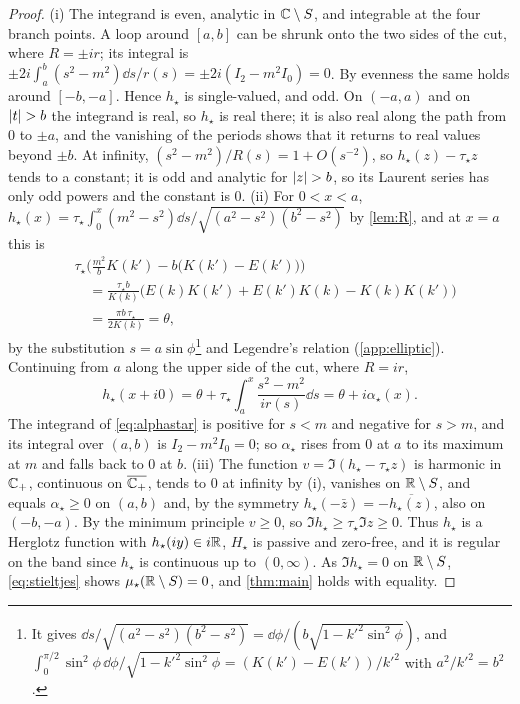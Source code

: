 \begin{proof}
(i) The integrand is even, analytic in $\mathbb C\setminus S$, and integrable at the
four branch points. A loop around $[a,b]$ can be shrunk onto the two sides of
the cut, where $R=\pm ir$; its integral is $\pm2i\int_a^b(s^2-m^2)\dd s/r(s)
=\pm2i(I_2-m^2I_0)=0$. By evenness the same holds around $[-b,-a]$. Hence
$h_\star$ is single-valued, and odd. On $(-a,a)$ and on $\abs t>b$ the
integrand is real, so $h_\star$ is real there; it is also real along the
path from $0$ to $\pm a$, and the vanishing of the periods shows that it
returns to real values beyond $\pm b$. At infinity,
$(s^2-m^2)/R(s)=1+O(s^{-2})$, so $h_\star(z)-\tau_\star z$ tends to a constant;
it is odd and analytic for $\abs z>b$, so its Laurent series has only odd
powers and the constant is $0$.
(ii) For $0<x<a$, $h_\star(x)=\tau_\star\int_0^x(m^2-s^2)\dd s/\sqrt{(a^2-s^2)(b^2-s^2)}$
by \cref{lem:R}, and at $x=a$ this is
\begin{align*}
&\tau_\star\Big(\frac{m^2}bK(k')-b\big(K(k')-E(k')\big)\Big)\\
&\quad=\frac{\tau_\star b}{K(k)}\big(E(k)K(k')+E(k')K(k)-K(k)K(k')\big)\\
&\quad=\frac{\pi b\,\tau_\star}{2K(k)}=\theta ,
\end{align*}
by the substitution $s=a\sin\phi$\footnote{It gives $\dd s/\sqrt{(a^2-s^2)(b^2-s^2)}=\dd\phi/(b\sqrt{1-k'^2\sin^2\phi})$, and $\int_0^{\pi/2}\sin^2\phi\,\dd\phi/\sqrt{1-k'^2\sin^2\phi}=(K(k')-E(k'))/k'^2$ with $a^2/k'^2=b^2$.} and Legendre's relation
(\cref{app:elliptic}). Continuing from $a$ along the upper side of the cut,
where $R=ir$,
\[
h_\star(x+i0)=\theta+\tau_\star\int_a^x\frac{s^2-m^2}{ir(s)}\dd s=\theta+i\alpha_\star(x).
\]
The integrand of \eqref{eq:alphastar} is positive for $s<m$ and negative for
$s>m$, and its integral over $(a,b)$ is $I_2-m^2I_0=0$; so $\alpha_\star$
rises from $0$ at $a$ to its maximum at $m$ and falls back to $0$ at $b$.
(iii) The function $v=\Im(h_\star-\tau_\star z)$ is harmonic in $\mathbb C_{+}$,
continuous on $\overline{\mathbb C_{+}}$, tends to $0$ at infinity by (i), vanishes on
$\mathbb R\setminus S$, and equals $\alpha_\star\ge0$ on $(a,b)$ and, by the symmetry
$h_\star(-\bar z)=-\overline{h_\star(z)}$, also on $(-b,-a)$. By the minimum
principle $v\ge0$, so $\Im h_\star\ge\tau_\star\Im z\ge0$. Thus $h_\star$ is a
Herglotz function with $h_\star(iy)\in i\mathbb R$, $H_\star$ is passive and zero-free,
and it is regular on the band since $h_\star$ is continuous up to $(0,\infty)$.
As $\Im h_\star=0$ on $\mathbb R\setminus S$, \eqref{eq:stieltjes} shows
$\mu_\star(\mathbb R\setminus S)=0$, and \cref{thm:main} holds with equality.
\end{proof}

